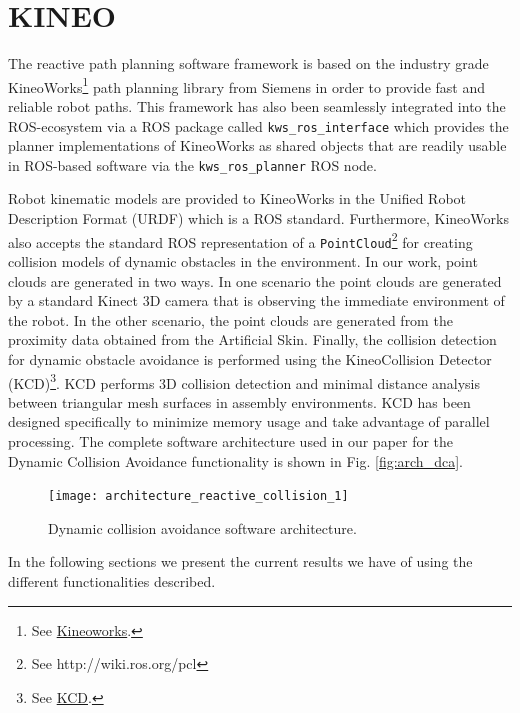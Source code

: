 \section{KINEO}
\hypersetup{colorlinks, linkcolor=blue}
The reactive path planning software framework is based on the industry grade KineoWorks\texttrademark\footnote{See
\href{http://www.plm.automation.siemens.com/en\_us/products/open/kineo/kineoworks/index.shtml}{Kineoworks}.} path planning library from Siemens in order to provide fast and reliable robot paths. This framework has also been seamlessly integrated into the ROS-ecosystem via a ROS package called \texttt{kws\_ros\_interface} which provides the planner implementations of KineoWorks as shared objects that are readily usable in ROS-based software via the \texttt{kws\_ros\_planner} ROS node.

Robot kinematic models are provided to KineoWorks in the Unified Robot Description Format (URDF) which is a ROS standard. Furthermore, KineoWorks also accepts the standard ROS representation of a \texttt{PointCloud}\footnote{See http://wiki.ros.org/pcl} for creating collision models of dynamic obstacles in the environment. In our work, point clouds are generated in two ways. In one scenario the point clouds are generated by a standard Kinect 3D camera that is observing the immediate environment of the robot. In the other scenario, the point clouds are generated from the proximity data obtained from the Artificial Skin. Finally, the collision detection for dynamic obstacle avoidance is performed using the Kineo\texttrademark Collision Detector (KCD)\footnote{See \href{http://www.plm.automation.siemens.com/en\_us/products/open/kineo/collision-detector/index.shtml}{KCD}.}. KCD performs 3D collision detection and minimal distance analysis between triangular mesh surfaces in assembly environments. KCD has been designed specifically to minimize memory usage and take advantage of parallel processing. The complete software architecture used in our paper for the Dynamic Collision Avoidance functionality is shown in Fig. \ref{fig:arch_dca}.
\begin{figure}[t]
\centering
\texttt{[image: architecture\_reactive\_collision\_1]}
\caption[]{Dynamic collision avoidance software architecture.}
\label{fig:dca}
\end{figure}

In the following sections we present the current results we have of using the different functionalities described.




